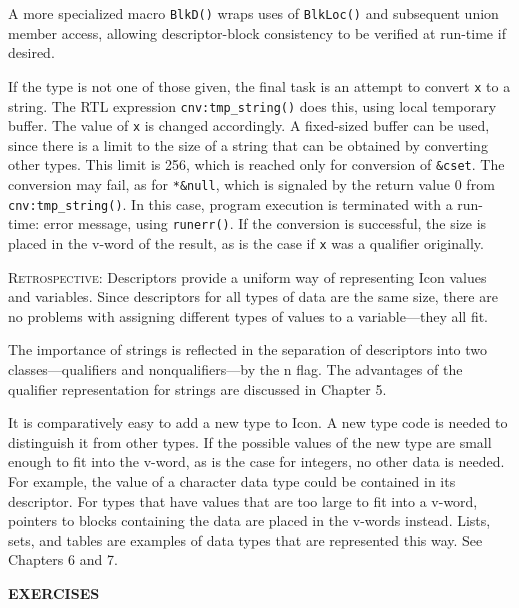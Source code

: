 A more specialized macro \texttt{BlkD()} wraps uses of
\texttt{BlkLoc()} and subsequent union member access, allowing
descriptor-block consistency to be verified at run-time if desired.


If the type is not one of those given, the final task is an attempt to
convert \texttt{x} to a string. The RTL expression
\texttt{cnv:tmp\_string()} does this, using local temporary
buffer. The value of \texttt{x} is changed accordingly. A fixed-sized
buffer can be used, since there is a limit to the size of a string
that can be obtained by converting other types. This limit is 256,
which is reached only for conversion of \texttt{\&cset}. The
conversion may fail, as for \texttt{*\&null}, which is signaled by the
return value 0 from \texttt{cnv:tmp\_string()}. In this case, program
execution is terminated with a run-time: error message, using
\texttt{runerr()}. If the conversion is successful, the size is placed
in the v-word of the result, as is the case if \texttt{x} was a
qualifier originally.

\textsc{Retrospective}: Descriptors provide a uniform way of
representing Icon values and variables. Since descriptors for all
types of data are the same size, there are no problems with assigning
different types of values to a variable---they all fit.

The importance of strings is reflected in the separation of
descriptors into two classes---qualifiers and nonqualifiers---by the n
flag. The advantages of the qualifier representation for strings are
discussed in Chapter 5.

It is comparatively easy to add a new type to Icon. A new type code is
needed to distinguish it from other types. If the possible values of
the new type are small enough to fit into the v-word, as is the case
for integers, no other data is needed. For example, the value of a
character data type could be contained in its descriptor. For types
that have values that are too large to fit into a v-word, pointers to
blocks containing the data are placed in the v-words instead. Lists,
sets, and tables are examples of data types that are represented this
way. See Chapters 6 and 7.

{\sffamily\bfseries
EXERCISES}

